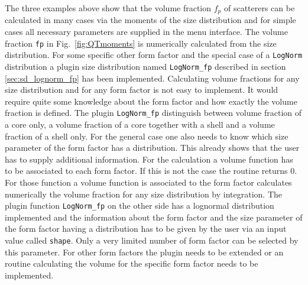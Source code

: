 The three examples above show that the volume fraction $f_p$ of
scatterers can be calculated in many cases via the moments of the
size distribution and for simple cases all necessary parameters are
supplied in the \SASfit menu interface. The volume fraction
\texttt{fp} in Fig.\ \ref{fig:QTmoments} is numerically calculated
from the size distribution. For some specific other form factor and
the special case of a \texttt{LogNorm} distribution a plugin size
distribution named \texttt{LogNorm\_fp} described in section
\ref{sec:sd_lognorm_fp} has been implemented. Calculating volume
fractions for any size distribution and for any form factor is not
easy to implement. It would require quite some knowledge about the
form factor and how exactly the volume fraction is defined. The
plugin \texttt{LogNorm\_fp} distinguish between volume fraction of a
core only, a volume fraction of a core together with a shell and a
volume fraction of a shell only. For the general case one also needs
to know which size parameter of the form factor has a distribution.
This already shows that the user has to supply additional
information. For the calculation a volume function has to be
associated to each form factor. If this is not the case the \SASfit
routine returns 0. For those function a volume function is
associated to the form factor \SASfit calculates numerically the
volume fraction for any size distribution by integration. The plugin
function \texttt{LogNorm\_fp} on the other side has a lognormal
distribution implemented and the information about the form factor
and the size parameter of the form factor having a distribution has
to be given by the user via an input value called \texttt{shape}.
Only a very limited number of form factor can be selected by this
parameter. For other form factors the plugin needs to be extended or
an routine calculating the volume for the specific form factor needs
to be implemented.
